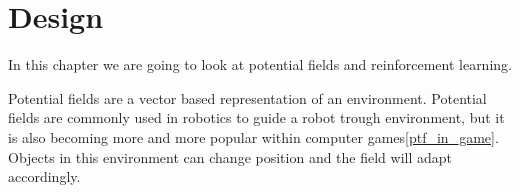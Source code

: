\chapter{Design}\label{design}
	In this chapter we are going to look at potential fields and reinforcement learning.
	
	Potential fields are a vector based representation of an environment. Potential fields are commonly used in robotics to guide a robot trough environment, but it is also becoming more and more popular within computer games\ref{ptf_in_game}. Objects in this environment can change position and the field will adapt accordingly. 
	
	
	
	
	